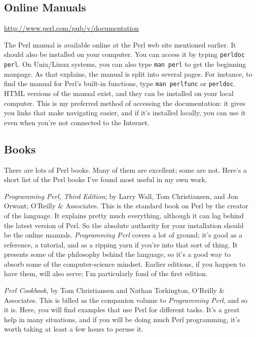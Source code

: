 \subsection{Online Manuals}
\href{http://www.perl.com/pub/v/documentation}{http://www.perl.com/pub/v/documentation}

\begin{adjustwidth}{1cm}{}
The Perl manual is available online at the Perl web site mentioned earlier. It should also be installed on your computer. You can access it by typing \verb|perldoc perl|. On Unix/Linux systems, you can also type \verb|man perl| to get the beginning manpage. As that explains, the manual is split into several pages. For instance, to find the manual for Perl's built-in functions, type \verb|man perlfunc| or \verb|perldoc|. HTML versions of the manual exist, and they can be installed on your local computer. This is my preferred method of accessing the documentation: it gives you links that make navigating easier, and if it's installed locally, you can use it even when you're not connected to the Internet.
\end{adjustwidth}

\subsection{Books}
There are lots of Perl books. Many of them are excellent; some are not. Here's a short list of the Perl books I've found most useful in my own work.

\textit{Programming Perl, Third Edition}; by Larry Wall, Tom Christiansen, and Jon Orwant; O'Reilly \& Associates. This is the standard book on Perl by the creator of the language. It explains pretty much everything, although it can lag behind the latest version of Perl. So the absolute authority for your installation should be the online manuals. \textit{Programming Perl} covers a lot of ground; it's good as a reference, a tutorial, and as a ripping yarn if you're into that sort of thing. It presents some of the philosophy behind the language, so it's a good way to absorb some of the computer-science mindset. Earlier editions, if you happen to have them, will also serve; I'm particularly fond of the first edition.

\textit{Perl Cookbook}, by Tom Christiansen and Nathan Torkington, O'Reilly \& Associates. This is billed as the companion volume to \textit{Programming Perl}, and so it is. Here, you will find examples that use Perl for different tasks. It's a great help in many situations, and if you will be doing much Perl programming, it's worth taking at least a few hours to peruse it.

